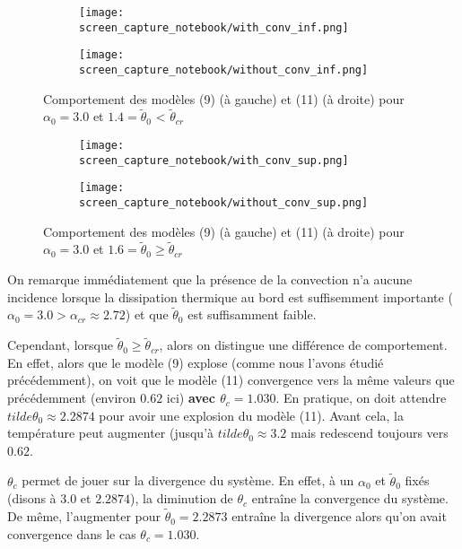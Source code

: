 \documentclass[10pt,a4paper,twocolumn]{report}
\begin{document}
\begin{figure*}
		\centering
		\begin{subfigure}{}
        	\texttt{[image: screen\_capture\_notebook/with\_conv\_inf.png]}
    	\end{subfigure}
		\centering  	
   		\begin{subfigure}{}
        	\texttt{[image: screen\_capture\_notebook/without\_conv\_inf.png]}
    	\end{subfigure}
   	\caption{Comportement des modèles (9) (à gauche) et (11) (à droite) pour $\alpha_0 = 3.0$ et $1.4 = \tilde{\theta}_0$ < $\tilde{\theta}_{cr}$}
    \label{fig:comportement_selon_convection_inf}
	\end{figure*}

\begin{figure*}
		\centering
		\begin{subfigure}{}
        	\texttt{[image: screen\_capture\_notebook/with\_conv\_sup.png]}
    	\end{subfigure}
		\centering  	
   		\begin{subfigure}{}
        	\texttt{[image: screen\_capture\_notebook/without\_conv\_sup.png]}
    	\end{subfigure}
   	\caption{Comportement des modèles (9) (à gauche) et (11) (à droite) pour $\alpha_0 = 3.0$ et $1.6 = \tilde{\theta}_0 \geq \tilde{\theta}_{cr}$}
    \label{fig:comportement_selon_convection_sup}
	\end{figure*}
	
On remarque immédiatement que la présence de la convection n'a aucune incidence lorsque la dissipation thermique au bord est suffisemment importante ($\alpha_0 = 3.0 > \alpha_{cr} \approx 2.72$) et que $\tilde{\theta}_0$ est suffisamment faible. 

Cependant, lorsque  $\tilde{\theta}_0 \geq \tilde{\theta}_{cr}$, alors on distingue une différence de comportement. En effet, alors que le modèle (9) explose (comme nous l'avons étudié précédemment), on voit que le modèle (11) convergence vers la même valeurs que précédemment (environ $0.62$ ici) \textbf{avec $\theta_c = 1.030$}. En pratique, on doit attendre $tilde{\theta}_0 \approx 2.2874$ pour avoir une explosion du modèle (11). Avant cela, la température peut augmenter (jusqu'à $tilde{\theta}_0 \approx 3.2$ mais redescend toujours vers $0.62$.

$\theta_c$ permet de jouer sur la divergence du système. En effet, à un $\alpha_0$ et $\tilde{\theta}_0$ fixés (disons à $3.0$ et $2.2874$), la diminution de $\theta_c$ entraîne la convergence du système. De même, l'augmenter pour $\tilde{\theta}_0 = 2.2873$ entraîne la divergence alors qu'on avait convergence dans le cas $\theta_c = 1.030$.
\end{document}
